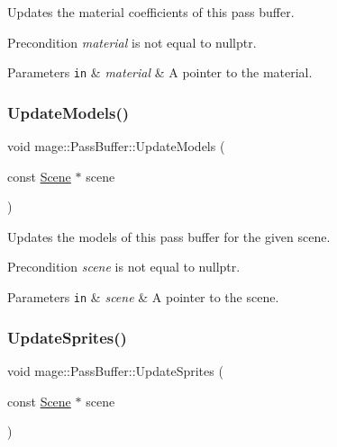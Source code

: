 Updates the material coefficients of this pass buffer.

\begin{DoxyPrecond}{Precondition}
{\itshape material} is not equal to {\ttfamily nullptr}. 
\end{DoxyPrecond}

\begin{DoxyParams}[1]{Parameters}
\mbox{\tt in}  & {\em material} & A pointer to the material. \\
\hline
\end{DoxyParams}
\hypertarget{structmage_1_1_pass_buffer_a02d68f950566e8283d3fc74bdf19b66a}{}\label{structmage_1_1_pass_buffer_a02d68f950566e8283d3fc74bdf19b66a} 
\subsubsection{\texorpdfstring{Update\+Models()}{UpdateModels()}}
{\footnotesize\ttfamily void mage\+::\+Pass\+Buffer\+::\+Update\+Models (\begin{DoxyParamCaption}\item[{const \hyperlink{classmage_1_1_scene}{Scene} $\ast$}]{scene }\end{DoxyParamCaption})\hspace{0.3cm}{\ttfamily [private]}}

Updates the models of this pass buffer for the given scene.

\begin{DoxyPrecond}{Precondition}
{\itshape scene} is not equal to {\ttfamily nullptr}. 
\end{DoxyPrecond}

\begin{DoxyParams}[1]{Parameters}
\mbox{\tt in}  & {\em scene} & A pointer to the scene. \\
\hline
\end{DoxyParams}
\hypertarget{structmage_1_1_pass_buffer_a8301fd646965c627f29120f412078ca1}{}\label{structmage_1_1_pass_buffer_a8301fd646965c627f29120f412078ca1} 
\subsubsection{\texorpdfstring{Update\+Sprites()}{UpdateSprites()}}
{\footnotesize\ttfamily void mage\+::\+Pass\+Buffer\+::\+Update\+Sprites (\begin{DoxyParamCaption}\item[{const \hyperlink{classmage_1_1_scene}{Scene} $\ast$}]{scene }\end{DoxyParamCaption})\hspace{0.3cm}{\ttfamily [private]}}

